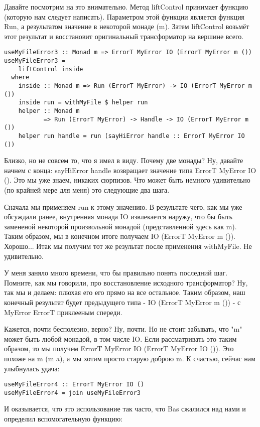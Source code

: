 Давайте посмотрим на это внимательно. Метод liftControl принимает функцию (которую нам следует написать). Параметром этой функции является функция Run, а результатом значение в некоторой монаде (m). Затем liftControl возьмёт этот результат и восстановит оригинальный трансформатор на вершине всего.

\begin{lstlisting}
useMyFileError3 :: Monad m => ErrorT MyError IO (ErrorT MyError m ())
useMyFileError3 =
    liftControl inside
  where
    inside :: Monad m => Run (ErrorT MyError) -> IO (ErrorT MyError m ())
    inside run = withMyFile $ helper run
    helper :: Monad m
           => Run (ErrorT MyError) -> Handle -> IO (ErrorT MyError m ())
    helper run handle = run (sayHiError handle :: ErrorT MyError IO ())
\end{lstlisting}

Близко, но не совсем то, что я имел в виду. Почему две монады? Ну, давайте начнем с конца: sayHiError handle возвращает значение типа ErrorT MyError IO (). Это мы уже знаем, никаких сюрпизов. Что может быть немного удивительно (по крайней мере для меня) это следующие два шага.

Сначала мы применяем run к этому значению. В результате чего, как мы уже обсуждали ранее, внутренняя монада IO извлекается наружу, что бы быть замененой некоторой произвольной монадой (представленной здесь как m). Таким образом, мы в конечном итоге получаем IO (ErrorT MyError m ()). Хорошо... Итак мы получим тот же результат после применения withMyFile. Не удивительно.

У меня заняло много времени, что бы правильно понять последний шаг. Помните, как мы говорили, про восстановление исходного трансформатор? Ну, так мы и делаем: плюхая его  его прямо на все остальное. Таким образом, наш конечный результат будет предыдущего типа - IO (ErrorT MyError m ()) - с MyError ErrorT приклееным спереди.

Кажется, почти бесполезно, верно? Ну, почти. Но не стоит забывать, что "m" может быть любой монадой, в том числе IO. Если рассматривать это таким образом, то мы получем ErrorT MyError IO (ErrorT MyError IO ()). Это похоже на m (m a), а мы хотим просто старую доброю m. К счастью, сейчас нам улыбнулась удача:

\begin{lstlisting}
useMyFileError4 :: ErrorT MyError IO ()
useMyFileError4 = join useMyFileError3
\end{lstlisting}

И оказывается, что это использование так часто, что Bas сжалился над нами и определил вспомогательную функцию:

